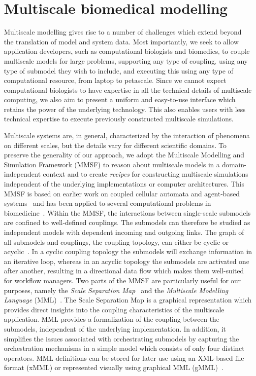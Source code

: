 \documentclass[a4,10pt]{article}
\begin{document}
\section{Multiscale biomedical modelling}\label{Sec:multmodel}

Multiscale modelling gives rise to a number of challenges which extend beyond
the translation of model and system data. Most importantly, we seek to allow
application developers, such as computational biologists and biomedics, to couple multiscale
models for large problems, supporting any type of coupling, using any type of
submodel they wish to include, and executing this using any type of
computational resource, from laptop to petascale. Since we cannot expect
computational biologists to have expertise in all the technical details of
multiscale computing, we also aim to present a uniform and easy-to-use
interface which retains the power of the underlying technology. This also
enables users with less technical expertise to execute previously constructed
multiscale simulations.

Multiscale systems are, in general, characterized by the interaction of
phenomena on different scales, but the details vary for different
scientific domains. To preserve the generality of our approach, we adopt the
Multiscale Modelling and Simulation Framework (MMSF) to reason about multiscale
models in a domain-independent context and to create {\em recipes} for
constructing multiscale simulations independent of the underlying
implementations or computer architectures.  This MMSF is based on earlier work
on coupled cellular automata and agent-based
systems~\cite{Hoekstra:2007-2,Hoekstra:2010} and has been applied to several
computational problems in biomedicine~\cite{Evans:2008,Caiazzo:2011,Tahir:2011}.
Within the MMSF, the interactions between single-scale submodels are confined
to well-defined couplings. The submodels can therefore be studied as
independent models with dependent incoming and outgoing links. The graph of all
submodels and couplings, the coupling topology, can either be cyclic or
acyclic~\cite{Borgdorff:2011}.  In a cyclic coupling topology the submodels
will exchange information in an iterative loop, whereas in an
acyclic topology the submodels are activated one after another, resulting in a
directional data flow which makes them well-suited for workflow managers. Two
parts of the MMSF are particularly useful for our purposes, namely the {\em
Scale Separation Map}~\cite{Hoekstra:2007-2} and the {\em Multiscale Modelling
Language} (MML)~\cite{Falcone:2010,Borgdorff:2012}. The Scale Separation Map is
a graphical representation which provides direct insights into the coupling
characteristics of the multiscale application. MML provides a formalization of
the coupling between the submodels, independent of the underlying
implementation. In addition, it simplifies the issues associated with
orchestrating submodels by capturing the orchestration mechanisms in a simple
model which consists of only four distinct operators. MML definitions can be
stored for later use using an XML-based file format (xMML) or represented
visually using graphical MML (gMML)~\cite{Borgdorff:2012}.
\end{document}
